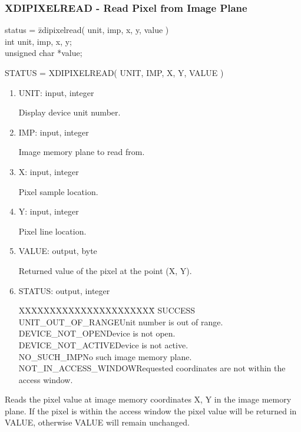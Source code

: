 \subsubsection{XDIPIXELREAD - Read Pixel from Image Plane}
\begin{tabbing}
status = \=zdipixelread( unit, imp, x, y, value )\\
\>int  unit, imp, x, y;\\
\>unsigned char  *value;\\
\end{tabbing}
STATUS = XDIPIXELREAD( UNIT, IMP, X, Y, VALUE )
\begin{enumerate}
\item UNIT:  input, integer

Display device unit number.
\item IMP:  input, integer

Image memory plane to read from.
\item X:  input, integer

Pixel sample location.
\item Y:  input, integer

Pixel line location.
\item VALUE:  output, byte

Returned value of the pixel at the point (X, Y).
\item STATUS:  output, integer
\begin{tabbing}
XXXXXXXXXXXXXXXXXXXXXX\=\kill
SUCCESS\\
UNIT\_OUT\_OF\_RANGE\>Unit number is out of range.\\
DEVICE\_NOT\_OPEN\>Device is not open.\\
DEVICE\_NOT\_ACTIVE\>Device is not active.\\
NO\_SUCH\_IMP\>No such image memory plane.\\
NOT\_IN\_ACCESS\_WINDOW\>Requested coordinates are not within the access window.\\
\end{tabbing}
\end{enumerate}
Reads the pixel value at image memory coordinates X, Y in the image
memory plane.  If the pixel is within the access window the pixel
value will be returned in VALUE, otherwise VALUE will remain
unchanged.
\newpage
